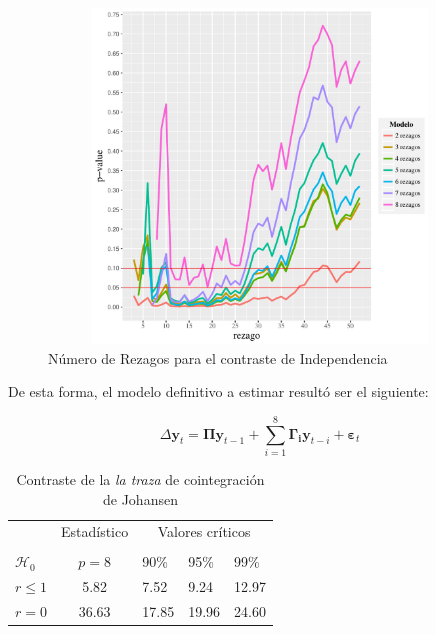\documentclass[12pt, twoside]{book}\usepackage[]{graphicx}\usepackage[]{color}
\newenvironment{knitrout}{}{} %
\numberwithin{equation}{section}
\numberwithin{theorem}{section}
\numberwithin{teorema}{section}
\numberwithin{defi}{section}
\numberwithin{prop}{section}
\numberwithin{defi}{section}
\theoremstyle{plain}
\begin{document}
\begin{knitrout}
\color{fgcolor}\begin{figure}[H]

{\centering \includegraphics[width=5in,height=3.5in]{figure/unnamed-chunk-18-1} 

}

\caption{Número de Rezagos para el contraste de Independencia\label{fig5.6}}\label{fig:unnamed-chunk-18}
\end{figure}


\end{knitrout}

De esta forma, el modelo definitivo a estimar resultó ser el siguiente: 

\begin{equation}
\Delta \mathbf{y}_{t} = \boldsymbol{\Pi}\mathbf{y}_{t-1}+\sum_{i=1}^{8}\boldsymbol{\Gamma_{i}}\mathbf{y}_{t-i}+\boldsymbol{\varepsilon}_{t}
\end{equation}





\begin{table}[h]
\caption{Contraste de la \textit{la traza} de cointegración de Johansen}
\begin{center}
\begin{tabular}{@{}lrllll@{}}
\toprule
\multicolumn{1}{l}{} & \multicolumn{2}{c}{Estadístico} &
\multicolumn{3}{c}{Valores críticos} \\
\cmidrule(l){2-3} \cmidrule(l){4-6} \\
\multicolumn{1}{l}{$\mathcal{H}_0$} & \multicolumn{2}{c}{$p = 8$} &
\multicolumn{1}{l}{90\%}&
\multicolumn{1}{l}{95\%}&
\multicolumn{1}{l}{99\%}
\\
\midrule
$r \leq 1$  & \multicolumn{2}{c}{5.82}  & 7.52 & 9.24 & 12.97\\
$r = 0$     & \multicolumn{2}{c}{ 36.63}  & 17.85 & 19.96 & 24.60\\
\bottomrule
\end{tabular}
\end{center}
\label{tab-10}
\end{table}
\end{document}
